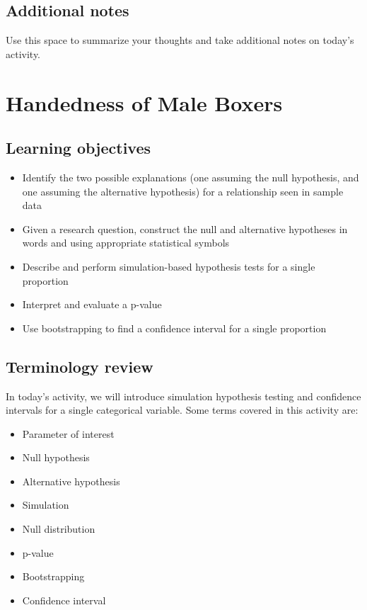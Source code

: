 \documentclass[
]{report}
\begin{document}
\vspace{1in}

\hypertarget{additional-notes}{%
\section{Additional notes}\label{additional-notes}}

Use this space to summarize your thoughts and take additional notes on today's activity.

\hypertarget{handedness-of-male-boxers}{%
\chapter{Handedness of Male Boxers}\label{handedness-of-male-boxers}}

\hypertarget{learning-objectives}{%
\section{Learning objectives}\label{learning-objectives}}

\begin{itemize}
\item
  Identify the two possible explanations (one assuming the null hypothesis, and one assuming the alternative hypothesis) for a relationship seen in sample data
\item
  Given a research question, construct the null and alternative hypotheses
  in words and using appropriate statistical symbols
\item
  Describe and perform simulation-based hypothesis tests for a single proportion
\item
  Interpret and evaluate a p-value
\item
  Use bootstrapping to find a confidence interval for a single proportion
\end{itemize}

\hypertarget{terminology-review}{%
\section{Terminology review}\label{terminology-review}}

In today's activity, we will introduce simulation hypothesis testing and confidence intervals for a single categorical variable. Some terms covered in this activity are:

\begin{itemize}
\item
  Parameter of interest
\item
  Null hypothesis
\item
  Alternative hypothesis
\item
  Simulation
\item
  Null distribution
\item
  p-value
\item
  Bootstrapping
\item
  Confidence interval
\end{itemize}
\end{document}
